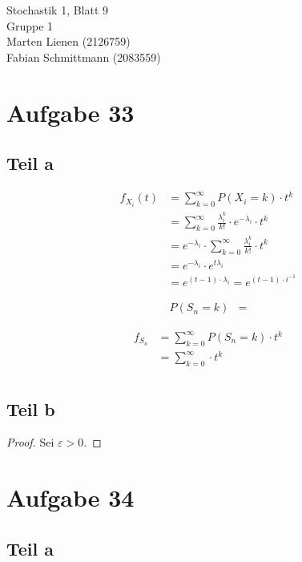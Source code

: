 \documentclass[10pt,a4paper]{article}
\begin{document}
Stochastik 1, Blatt 9\\
Gruppe 1\\
Marten Lienen (2126759)\\
Fabian Schmittmann (2083559)

\section{Aufgabe 33}

\subsection{Teil a}

\begin{align*}
  f_{X_{i}}(t) & = \sum_{k = 0}^{\infty} P(X_{i} = k) \cdot t^{k}\\
  & = \sum_{k = 0}^{\infty} \frac{\lambda_{i}^{k}}{k!} \cdot e^{-\lambda_{i}} \cdot t^{k}\\
  & = e^{-\lambda_{i}} \cdot \sum_{k = 0}^{\infty} \frac{\lambda_{i}^{k}}{k!} \cdot t^{k}\\
  & = e^{-\lambda_{i}} \cdot e^{t\lambda_{i}}\\
  & = e^{(t - 1) \cdot \lambda_{i}} = e^{(t - 1) \cdot i^{-1}}
\end{align*}

\begin{align*}
  P\left( S_{n} = k \right) & =
\end{align*}

\begin{align*}
  f_{S_{n}} & = \sum_{k = 0}^{\infty} P(S_{n} = k) \cdot t^{k}\\
  & = \sum_{k = 0}^{\infty}  \cdot t^{k}\\
\end{align*}

\subsection{Teil b}

\begin{proof}
  Sei $\varepsilon > 0$.
\end{proof}

\section{Aufgabe 34}

\subsection{Teil a}
\end{document}
